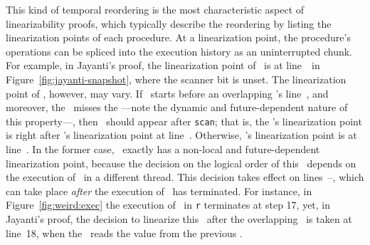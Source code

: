 This kind of temporal reordering is the most characteristic aspect of
linearizability proofs, which typically describe the reordering by
listing the linearization points of each procedure. At a linearization
point, the procedure's operations can be spliced into the execution
history as an uninterrupted chunk. For example, in Jayanti's proof,
the linearization point of \jyscan~is at line~\lineScanUnsetsS\ in
Figure~\ref{fig:jayanti-snapshot}, where the scanner bit is unset. The
linearization point of \jywrite, however, may vary. If
\jywrite~starts before an overlapping \jyscan's line~\lineScanUnsetsS,
and moreover, the \jyscan~misses the \jywrite---note the dynamic and
future-dependent nature of this property---, then \jywrite~should
appear after {\tt scan}; that is, the \jywrite's linearization point
is right after \jyscan's linearization point at line~\lineScanUnsetsS.
%
Otherwise, \jywrite's linearization point is at line~\lineWrtWrt.
%
In the former case, \jywrite~exactly has a non-local and
future-dependent linearization point, because the decision on the
logical order of this \jywrite~depends on the execution of \jyscan~in
a different thread. This decision takes effect on
lines~\lineScanReadsFX--\lineScanReadsFY, which can take place
\emph{after} the execution of \jywrite~has terminated.
%
For instance, in Figure~\ref{fig:weird:exec} the execution
of \jywrite~in \texttt{r} terminates at step 17, yet, in Jayanti's
proof, the decision to linearize this \jywrite\ after the
overlapping \jyscan\ is taken at line~18, when the \jyscan\ reads the
value from the previous \jywrite.




